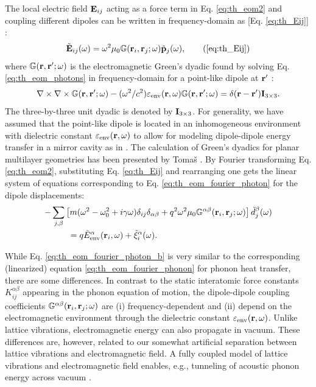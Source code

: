 The local electric field $\mathbf{E}_{ij}$ acting as a force term in Eq. \eqref{eq:th_eom2} and coupling different dipoles can be written in frequency-domain as [Eq. \eqref{eq:th_Eij}] \cite{novotny,rosa11}:
\begin{equation}
\tilde \bE_{ij}(\omega) = \omega^2 \mu_0 \mathbb{G}(\br_i,\br_j;\omega) \tilde{\bb{p}}_j(\omega), \tag{\ref{eq:th_Eij}}
\end{equation}
where $\mathbb{G}(\mathbf{r},\mathbf{r}';\omega)$ is the electromagnetic Green's dyadic found by solving Eq. \eqref{eq:th_eom_photons} in frequency-domain for a point-like dipole at $\mathbf{r}'$ \cite{novotny}:
 \begin{equation}
 \nabla \times \nabla \times \mathbb{G}(\mathbf{r},\mathbf{r}';\omega) - (\omega^2/c^2) \varepsilon_{\textrm{env}}(\mathbf{r},\omega)\mathbb{G}(\mathbf{r},\mathbf{r}';\omega)  =  \delta(\mathbf{r}-\mathbf{r}')\mathbf{I}_{3 \times 3}. \label{eq:intro_gemdef}
\end{equation}
The three-by-three unit dyadic is denoted by $\mathbf{I}_{3 \times 3}$. For generality, we have assumed that the point-like dipole is located in an inhomogeneous environment with dielectric constant $\varepsilon_{\textrm{env}}(\mathbf{r},\omega)$ to allow for modeling dipole-dipole energy transfer in a mirror cavity as in . The calculation of Green's dyadics for planar multilayer geometries has been presented by Toma\v{s} \cite{tomas95}. By Fourier transforming Eq. \eqref{eq:th_eom2}, substituting Eq. \eqref{eq:th_Eij} and rearranging one gets the linear system of equations corresponding to Eq. \eqref{eq:th_eom_fourier_photon} for the dipole displacements:
\begin{alignat}{2}
 - & \sum_{j,\beta} \left[m(\omega^2-\omega_0^2+i\gamma\omega) \delta_{ij}\delta_{\alpha\beta} +q^2 \omega^2 \mu_0 \mathbb{G}^{\alpha\beta}(\mathbf{r}_i,\mathbf{r}_j;\omega) \right]\tilde{d}_j^{\beta}(\omega) \notag \\
  & \qquad = q\tilde{E}_{\textrm{env}}^{\alpha}(\mathbf{r}_i,\omega) + \tilde{\xi}^{\alpha}_i(\omega). \label{eq:th_eom_fourier_photon_b}
\end{alignat}

While Eq. \eqref{eq:th_eom_fourier_photon_b} is very similar to the corresponding (linearized) equation \eqref{eq:th_eom_fourier_phonon} for phonon heat transfer, there are some differences. In contrast to the static interatomic force constants $K_{ij}^{\alpha\beta}$ appearing in the phonon equation of motion, the dipole-dipole coupling coefficients $\mathbb{G}^{\alpha\beta}(\mathbf{r}_i,\mathbf{r}_j;\omega)$ are (i) frequency-dependent and (ii) depend on the electromagnetic environment through the dielectric constant $\varepsilon_{\textrm{env}}(\mathbf{r},\omega)$. Unlike lattice vibrations, electromagnetic energy can also propagate in vacuum. These differences are, however, related to our somewhat artificial separation between lattice vibrations and electromagnetic field. A fully coupled model of lattice vibrations and electromagnetic field \cite{chiloyan15} enables, e.g., tunneling of acoustic phonon energy across vacuum \cite{prunnila10}.

